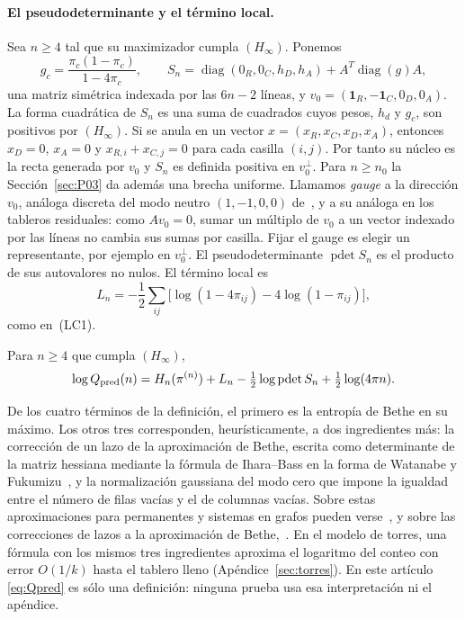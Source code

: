 \paragraph{El pseudodeterminante y el término local.}
Sea $n\ge4$ tal que su maximizador cumpla $(H_\infty)$. Ponemos
\begin{equation}\label{eq:gS}
 g_c=\frac{\pi_c(1-\pi_c)}{1-4\pi_c},\qquad
 S_n=\operatorname{diag}(0_R,0_C,h_D,h_A)+A^T\operatorname{diag}(g)A,
\end{equation}
una matriz simétrica indexada por las $6n-2$ líneas, y $v_0=(\mathbf1_R,-\mathbf1_C,0_D,0_A)$. La
forma cuadrática de $S_n$ es una suma de cuadrados cuyos pesos, $h_d$ y $g_c$, son positivos por
$(H_\infty)$. Si se anula en un vector
$x=(x_R,x_C,x_D,x_A)$, entonces $x_D=0$, $x_A=0$ y $x_{R,i}+x_{C,j}=0$ para cada casilla $(i,j)$. Por
tanto su núcleo es la recta generada por $v_0$ y $S_n$ es definida positiva en $v_0^\perp$. Para
$n\ge n_0$ la Sección~\ref{sec:P03}
da además una brecha uniforme. Llamamos \emph{gauge} a la dirección $v_0$, análoga discreta del modo neutro
$(1,-1,0,0)$
de~\cite[Sección~7.2]{Perfil}, y a su análoga en los tableros
residuales: como $Av_0=0$, sumar un múltiplo de $v_0$ a un vector indexado por las líneas no cambia sus
sumas por casilla. Fijar el gauge es elegir un representante, por ejemplo en $v_0^\perp$. El
pseudodeterminante
$\operatorname{pdet}S_n$ es el producto de sus autovalores no nulos. El término local es
\[
 L_n=-\frac12\sum_{ij}\bigl[\log(1-4\pi_{ij})-4\log(1-\pi_{ij})\bigr],
\]
como en~(LC1).

\begin{definicion}\label{def:Qpred}
Para $n\ge4$ que cumpla $(H_\infty)$,
\begin{equation}\label{eq:Qpred}
 \log Q_{\rm pred}(n)=H_n(\pi^{(n)})+L_n-\tfrac12\log\operatorname{pdet}S_n+\tfrac12\log(4\pi n).
\end{equation}
\end{definicion}

\begin{observacion}
De los cuatro términos de la definición, el primero es la entropía de Bethe en su máximo. Los otros
tres corresponden, heurísticamente, a dos ingredientes más: la corrección de un lazo de la
aproximación de Bethe, escrita como determinante de la matriz hessiana mediante la fórmula de
Ihara--Bass en la forma de Watanabe y Fukumizu~\cite{Bass,WF}, y la normalización gaussiana del modo
cero que impone la igualdad entre el número de filas vacías y el de columnas vacías. Sobre estas
aproximaciones para permanentes y sistemas en grafos pueden verse~\cite{CC,ChertkovYedidia,Vontobel},
y sobre las correcciones de lazos a la aproximación de Bethe,~\cite{MontanariRizzo}. En el modelo
de torres, una fórmula con los mismos tres ingredientes aproxima el logaritmo del conteo con error
$O(1/k)$ hasta el tablero lleno (Apéndice~\ref{sec:torres}). En este artículo \eqref{eq:Qpred} es
sólo una definición: ninguna prueba usa esa interpretación ni el apéndice.
\end{observacion}

